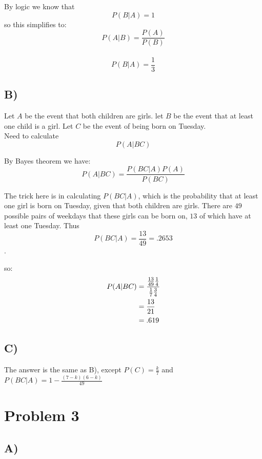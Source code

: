 \documentclass[11pt]{article}
\begin{document}
By logic we know that $$P(B|A) = 1$$ so this simplifies to:\\
\begin{equation}
    P(A|B) = \frac{P(A)}{P(B)}
  \end{equation}
  \\
\begin{equation}
  P(B|A) = \frac{1}{3}
\end{equation}

\subsection*{B)}
\label{sec:org1c9e3de}
Let \(A\) be the event that both children are girls. let \(B\) be the event that at least one child is a girl. Let \(C\) be the event of being born on Tuesday.\\

Need to calculate $$P(A|BC)$$

By Bayes theorem we have:
\begin{equation}
  P(A|BC) = \frac{P(BC|A)P(A)}{P(BC)}
\end{equation}


The trick here is in calculating \(P(BC|A)\), which is the probability that at least one girl is born on Tuesday, given that both children are girls. There are \(49\) possible pairs of weekdays that these girls can be born on, \(13\) of which have at least one Tuesday. Thus $$P(BC|A) = \frac{13}{49} = .2653$$.

so:\\
\begin{align}
P(A|BC) &= \cfrac{\frac{13}{49}\frac{1}{4}}{\frac{1}{7}\frac{3}{4}}\\
&=\frac{13}{21}\\
&=.619
\end{align}

\subsection*{C)}
\label{sec:org503bcad}

The answer is the same as B), except \(P(C) = \frac{k}{7}\) and \(P(BC|A) = 1 - \frac{(7-k)(6-k)}{49}\)


\section*{Problem 3}
\label{sec:org45692c9}
\subsection*{A)}
\label{sec:org12b0390}
\end{document}
